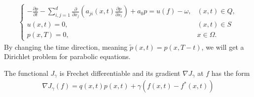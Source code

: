 \documentclass[]{article}
\begin{document}
\begin{align}\label{2.5} 
	\begin{cases}
		-\frac{\partial p}{\partial t}-\sum_{i, j=1}^{d}\frac{\partial}{\partial x_j}\left(a_{ji}(x, t)\frac{\partial p}{\partial x_i}\right)+a_0p=u(f)-\omega, & (x, t)\in Q,\\
		u(x, t)=0, & (x, t)\in S\\
		p(x, T)=0, & x\in \Omega.
	\end{cases}
\end{align}
By changing the time direction, meaning $\tilde{p}(x, t)=p(x, T-t)$, we will get a Dirichlet problem for parabolic equations.
\begin{dl}
	The functional $J_\gamma$ is Frechet differentiable and its gradient $\nabla J_\gamma$ at $f$ has the form 
	\begin{align}\label{2.6}
		\nabla J_\gamma(f)=q(x, t)p(x, t)+\gamma \left(f(x, t)-f^*(x, t)\right)
	\end{align}
\end{dl}
\end{document}
